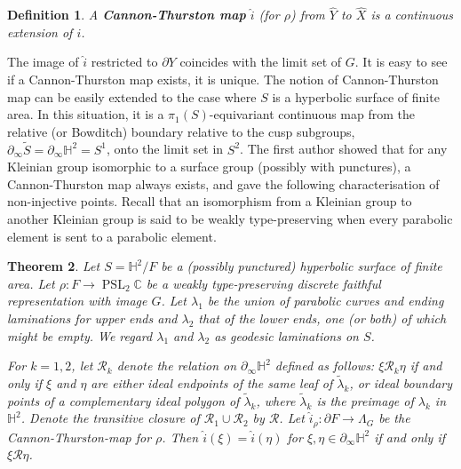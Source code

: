 \documentclass{amsart}
\newtheorem{theorem}{Theorem}[section]
\newtheorem{definition}[theorem]{Definition}
\theoremstyle{definition}
\newcommand{\complexes}{\mathbb{C}}
\newcommand{\pslc}{\operatorname{PSL}_2\complexes}
\newcommand\HHH{{\mathbb H}}
\newcommand\RR{{\mathcal R}}
\newcommand\Hyp{{\mathbb H}}
\newcommand\til{\widetilde}
\begin{document}
\begin{definition}  
	A {\bf Cannon-Thurston map}   $\hat{i}$ (for $\rho$)  from $\widehat{Y}$ to
	$\widehat{X}$ is a continuous extension of $i$.
\end{definition}
The image of $\hat{i}$ restricted to $\partial Y$ coincides with the limit set of $G$.
It is easy to see if a Cannon-Thurston map exists, it is unique.
The notion of Cannon-Thurston map can be easily extended to the case where $S$ is a  hyperbolic surface of finite area. In this situation, it is a $\pi_1(S)$-equivariant continuous map from the relative (or Bowditch) boundary relative to the cusp subgroups,  $\partial_\infty \til{S} = \partial_\infty \Hyp^2  =S^1$, onto the limit set in $S^2$. 
 The first author \cite{mahan-elct} showed that for any Kleinian group isomorphic to a surface group (possibly with punctures), a Cannon-Thurston map always exists, and gave the following characterisation of non-injective points.
 Recall that  an isomorphism from  a Kleinian group  to another Kleinian group is said to be weakly type-preserving when every parabolic element is sent to a parabolic element.

\begin{theorem} \cite{mahan-elct}  \label{ptpre-ct} Let $S= \HHH^2/F$ be a (possibly punctured) hyperbolic surface of finite area. 
Let $\rho : F \rightarrow \pslc$ be a weakly type-preserving   discrete faithful representation with  image $G$.
Let $\lambda_1$ be the union of parabolic curves and ending laminations for upper ends and $\lambda_2$  that of the lower ends, one (or both) of which might be empty.
We regard $\lambda_1$ and $\lambda_2$ as geodesic laminations on $S$.
%

For $k=1,2$, let $\RR_k$ denote the  relation on $\partial_\infty \HHH^2$  defined as follows: $\xi \RR_k \eta$ if and only if  $\xi$ and $\eta$ are  either ideal 
 endpoints of the same  leaf of $ \tilde \lambda_k$,  or ideal boundary points of a 
 complementary ideal polygon of  $\tilde \lambda_k$, where $\tilde \lambda_k$ is the preimage of $\lambda_k$ in $\HHH^2$. 
  Denote the  transitive closure of $\RR_1\cup \RR_2$ by $\RR$.
Let $\hat i_\rho : \partial {F} \to \Lambda_G$ be the Cannon-Thurston-map for $\rho$. Then $\hat i (\xi) = \hat i (\eta)$ for $\xi,\eta \in   \partial_\infty \HHH^2 $ if and only if 
$\xi \RR \eta$.  \end{theorem}
	
\end{document}
